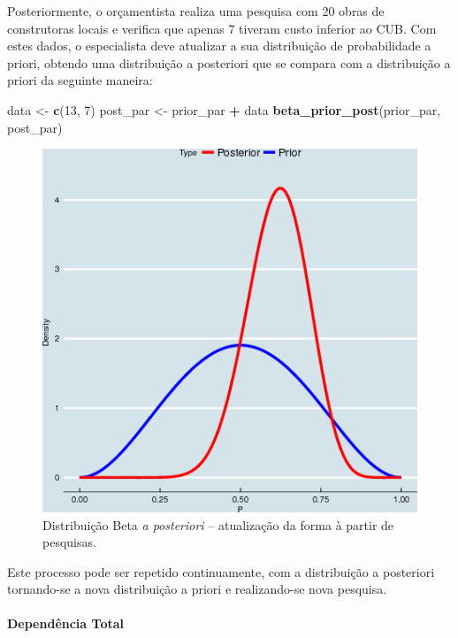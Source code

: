 \documentclass[a4paper]{article}
\newenvironment{Shaded}{\begin{snugshade}}{\end{snugshade}}
\newcommand{\KeywordTok}[1]{\textcolor[rgb]{0.13,0.29,0.53}{\textbf{#1}}}
\newcommand{\DecValTok}[1]{\textcolor[rgb]{0.00,0.00,0.81}{#1}}
\newcommand{\StringTok}[1]{\textcolor[rgb]{0.31,0.60,0.02}{#1}}
\newcommand{\OperatorTok}[1]{\textcolor[rgb]{0.81,0.36,0.00}{\textbf{#1}}}
\newcommand{\NormalTok}[1]{#1}
\let\oldparagraph\paragraph
\renewcommand{\paragraph}[1]{\oldparagraph{#1}\mbox{}}
\begin{document}
Posteriormente, o orçamentista realiza uma pesquisa com 20 obras de
construtoras locais e verifica que apenas 7 tiveram custo inferior ao
CUB. Com estes dados, o especialista deve atualizar a sua distribuição
de probabilidade a priori, obtendo uma distribuição a posteriori que se
compara com a distribuição a priori da seguinte maneira:

\begin{Shaded}
\begin{Highlighting}[]
\NormalTok{data <-}\StringTok{ }\KeywordTok{c}\NormalTok{(}\DecValTok{13}\NormalTok{, }\DecValTok{7}\NormalTok{)}
\NormalTok{post_par <-}\StringTok{ }\NormalTok{prior_par }\OperatorTok{+}\StringTok{ }\NormalTok{data}
\KeywordTok{beta_prior_post}\NormalTok{(prior_par, post_par)}
\end{Highlighting}
\end{Shaded}

\begin{figure}[H]

{\centering \includegraphics[width=0.7\linewidth]{images/betapriorpost-1} 

}

\caption{Distribuição Beta \emph{a posteriori} -- atualização da forma à partir de pesquisas.}\label{fig:betapriorpost}
\end{figure}

Este processo pode ser repetido continuamente, com a distribuição a
posteriori tornando-se a nova distribuição a priori e realizando-se nova
pesquisa.

\paragraph{Dependência Total}\label{dependencia-total}
\end{document}
